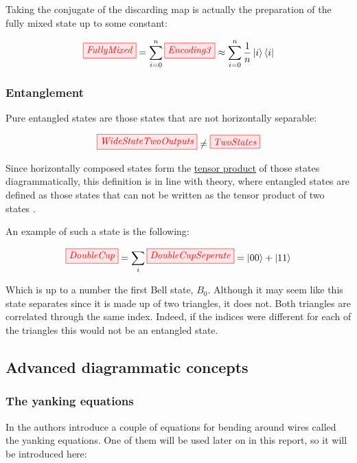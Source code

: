 \documentclass[]{article}
\begin{document}
Taking the conjugate of the discarding map is actually the preparation of the fully mixed state up to some constant:

\begin{equation}
	\tikzfig{FullyMixed} = \sum\limits_{i=0}^n \tikzfig{Encoding3} \approx \sum\limits_{i=0}^n \frac{1}{n} \ket{i} \bra{i}
\end{equation}

\subsubsection{Entanglement}
\label{entanglement}
Pure entangled states are those states that are not horizontally separable: 

\begin{equation}
\tikzfig{WideStateTwoOutputs} \neq \tikzfig{TwoStates}
\end{equation}

Since horizontally composed states form the \hyperref[doubling]{tensor product} of those states diagrammatically, this definition is in line with theory, where entangled states are defined as those states that can not be written as the tensor product of two states \cite{nielsen2011}. 

An example of such a state is the following:

\begin{equation}
\tikzfig{DoubleCup} = \sum\limits_{i} \tikzfig{DoubleCupSeperate} = \ket{00} + \ket{11}
\end{equation}

Which is up to a number the first Bell state, $B_0$. Although it may seem like this state separates since it is made up of two triangles, it does not. Both triangles are correlated through the same index. Indeed, if the indices were different for each of the triangles this would not be an entangled state.

\subsection{Advanced diagrammatic concepts}

\subsubsection{The yanking equations}

In \cite{Coecke2017} the authors introduce a couple of equations for bending around wires called the yanking equations. One of them will be used later on in this report, so it will be introduced here:
\end{document}
